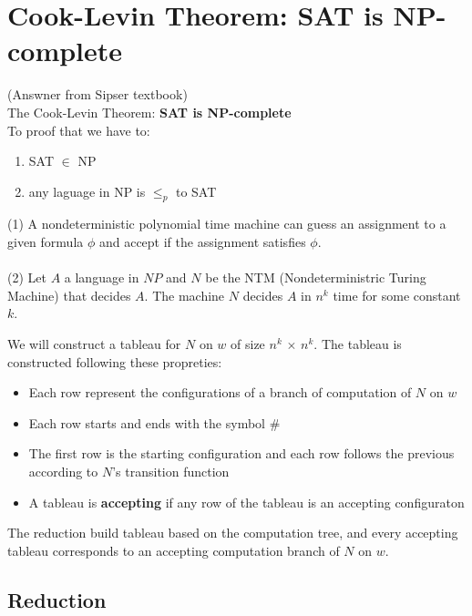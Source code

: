 \documentclass[letterpaper]{article}
\begin{document}
\section{Cook-Levin Theorem: SAT is NP-complete}

(Answner from Sipser textbook) \\

The Cook-Levin Theorem: \textbf{SAT is NP-complete} \\

To proof that we have to:


\begin{enumerate}
  \item SAT $\in$ NP
  \item any laguage in NP is $\leq_p$ to SAT
\end{enumerate}

(1) A nondeterministic polynomial
time machine can guess an assignment to a given formula $\phi$
and accept if the
assignment satisfies $\phi$.

\paragraph{}


(2) Let $A$ a language in $NP$ and $N$
 be the NTM (Nondeterministric Turing Machine)
that decides $A$. The machine $N$ decides $A$ in $n^k$ time for some constant
$k$.

We will construct a tableau for $N$ on $w$ of size $n^k$ $\times$ $n^k$.
The tableau is constructed following these propreties:

\begin{itemize}
  \item Each row represent the configurations
  of a branch of computation of $N$ on $w$
  \item Each row starts and ends with the symbol $\#$
  \item The first row is the starting configuration and each row follows the
  previous according to $N$'s transition function
  \item A tableau is \textbf{accepting} if any row of the tableau
  is an accepting configuraton
\end{itemize}

The reduction build tableau based on the computation tree, and
every accepting tableau corresponds to an accepting computation branch
of $N$ on $w$.

\subsection{Reduction}
\end{document}
